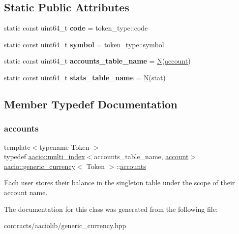 \subsection*{Static Public Attributes}
\begin{DoxyCompactItemize}
\item 
\mbox{\label{classaacio_1_1generic__currency_a9a1f3a7d4616ff2b4c5440883a3c9698}} 
static const uint64\+\_\+t {\bfseries code} = token\+\_\+type\+::code
\item 
\mbox{\label{classaacio_1_1generic__currency_a424e1d83b10ca0171352ec7c1a00e578}} 
static const uint64\+\_\+t {\bfseries symbol} = token\+\_\+type\+::symbol
\item 
\mbox{\label{classaacio_1_1generic__currency_ae0fba59dd33fb06997b002ed1ccb82b2}} 
static const uint64\+\_\+t {\bfseries accounts\+\_\+table\+\_\+name} = \mbox{\hyperlink{group__types_gaf9c1edb0e0da55ec6ba09f32f6839529}{N}}(\mbox{\hyperlink{structaacio_1_1generic__currency_1_1account}{account}})
\item 
\mbox{\label{classaacio_1_1generic__currency_af75c08e6723fe6ce4e8d73f5a969c8cd}} 
static const uint64\+\_\+t {\bfseries stats\+\_\+table\+\_\+name} = \mbox{\hyperlink{group__types_gaf9c1edb0e0da55ec6ba09f32f6839529}{N}}(stat)
\end{DoxyCompactItemize}


\subsection{Member Typedef Documentation}
\mbox{\label{classaacio_1_1generic__currency_acd98341a9c4955cf55e91a9e61eb6a7e}} 
\subsubsection{\texorpdfstring{accounts}{accounts}}
{\footnotesize\ttfamily template$<$typename Token $>$ \\
typedef \mbox{\hyperlink{classaacio_1_1multi__index}{aacio\+::multi\+\_\+index}}$<$accounts\+\_\+table\+\_\+name, \mbox{\hyperlink{structaacio_1_1generic__currency_1_1account}{account}}$>$ \mbox{\hyperlink{classaacio_1_1generic__currency}{aacio\+::generic\+\_\+currency}}$<$ Token $>$\+::\mbox{\hyperlink{classaacio_1_1generic__currency_acd98341a9c4955cf55e91a9e61eb6a7e}{accounts}}}

Each user stores their balance in the singleton table under the scope of their account name. 

The documentation for this class was generated from the following file\+:\begin{DoxyCompactItemize}
\item 
contracts/aaciolib/generic\+\_\+currency.\+hpp\end{DoxyCompactItemize}

